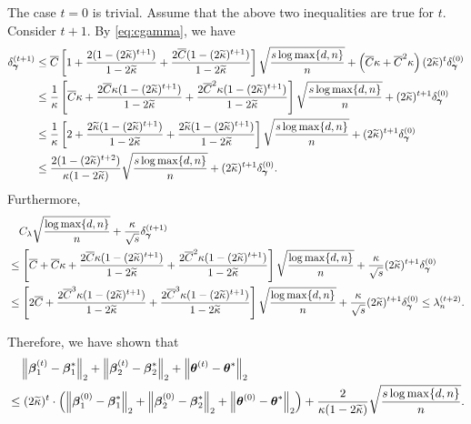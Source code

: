 The case $t=0$ is trivial. Assume that the above two inequalities are true for $t$. Consider $t+1$. By \eqref{eq:cgamma}, we have
\begin{align*}
	\delta_{\boldsymbol{\gamma}}^{(t+1)} 
	&\leq \overline{C} \left[ 1+\frac{2(1-(2\widetilde\kappa)^{t+1})}{1-2\widetilde\kappa}+\frac{2\overline{C}(1-(2\widetilde\kappa)^{t+1})}{1-2\widetilde\kappa} \right]\sqrt{\frac{s\log \max\{d,n\}}{n}} +\left( \overline{C}\kappa+\overline{C}^2\kappa \right)(2\widetilde{\kappa})^t\delta_{\boldsymbol{\gamma}}^{(0)}\\
	& \leq \frac{1}{\kappa} \left[ \overline{C}\kappa+\frac{2\overline{C}\kappa(1-(2\widetilde\kappa)^{t+1})}{1-2\widetilde\kappa}+\frac{2\overline{C}^2\kappa(1-(2\widetilde\kappa)^{t+1})}{1-2\widetilde\kappa} \right]\sqrt{\frac{s\log \max\{d,n\}}{n}}+(2\widetilde{\kappa})^{t+1}\delta_{\boldsymbol{\gamma}}^{(0)}\\
	& \leq \frac{1}{\kappa} \left[ 2+\frac{2\widetilde\kappa(1-(2\widetilde\kappa)^{t+1})}{1-2\widetilde\kappa}+\frac{2\widetilde\kappa(1-(2\widetilde\kappa)^{t+1})}{1-2\widetilde\kappa} \right]\sqrt{\frac{s\log \max\{d,n\}}{n}}+(2\widetilde{\kappa})^{t+1}\delta_{\boldsymbol{\gamma}}^{(0)}\\
	&\leq\frac{2(1-(2\widetilde\kappa)^{t+2})}{\kappa(1-2\widetilde\kappa)}\sqrt{\frac{s\log \max\{d,n\}}{n}}+(2\widetilde{\kappa})^{t+1}\delta_{\boldsymbol{\gamma}}^{(0)}.
\end{align*}
Furthermore,
\begin{align*}
	&\quad C_\lambda\sqrt{\frac{\log \max\{d,n\}}{n}} + \frac{\kappa}{\sqrt{s}}\delta_{\boldsymbol{\gamma}}^{(t+1)}\\
	& \leq  \left[ \overline{C}+\overline{C}\kappa+\frac{2\overline{C}\kappa(1-(2\widetilde\kappa)^{t+1})}{1-2\widetilde\kappa}+\frac{2\overline{C}^2\kappa(1-(2\widetilde\kappa)^{t+1})}{1-2\widetilde\kappa} \right]\sqrt{\frac{\log \max\{d,n\}}{n}}+\frac{\kappa}{\sqrt{s}}(2\widetilde{\kappa})^{t+1}\delta_{\boldsymbol{\gamma}}^{(0)}\\
	& \leq \left[ 2\overline{C}+\frac{2\overline{C}^3\kappa(1-(2\widetilde\kappa)^{t+1})}{1-2\widetilde\kappa}+\frac{2\overline{C}^3\kappa(1-(2\widetilde\kappa)^{t+1})}{1-2\widetilde\kappa} \right]\sqrt{\frac{\log \max\{d,n\}}{n}}+\frac{\kappa}{\sqrt{s}}(2\widetilde{\kappa})^{t+1}\delta_{\boldsymbol{\gamma}}^{(0)}	\leq\lambda_{n}^{(t+2)}.
\end{align*}
 
Therefore, we have shown that
\begin{equation*}
	\begin{aligned}
&\quad \left\lVert\boldsymbol{\beta}_1^{(t)} - \boldsymbol{\beta}_1^*\right\rVert_2 + \left\lVert\boldsymbol{\beta}_2^{(t)} - \boldsymbol{\beta}_2^*\right\rVert_2 + \left\lVert\boldsymbol{\theta}^{(t)} - \boldsymbol{\theta}^*\right\rVert_2 \\
& \leq
(2\widetilde\kappa)^t\cdot\left( \left\lVert\boldsymbol{\beta}_1^{(0)} - \boldsymbol{\beta}_1^*\right\rVert_2 + \left\lVert\boldsymbol{\beta}_2^{(0)} - \boldsymbol{\beta}_2^*\right\rVert_2 + \left\lVert\boldsymbol{\theta}^{(0)} - \boldsymbol{\theta}^*\right\rVert_2 \right)
+ \frac{2}{\kappa(1-2\widetilde\kappa)}\sqrt{\frac{s\log \max\{d,n\}}{n}}.
	\end{aligned}
\end{equation*}

